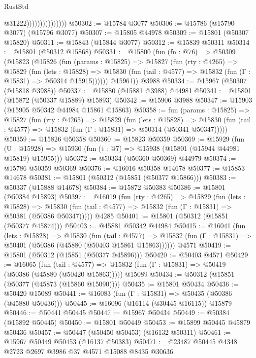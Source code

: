 \begin{lexlean}{RustStd}
\begin{coremodule}
                                  @31222)))))))))))))))
@50302 := @15784 @3077
@50306 := @15786 (@15790 @3077) (@15796 @3077)
@50307 := @15805 @44978
@50309 := @15801 (@50307 @15820)
@50311 := @15843 (@15844 @3077)
@50312 := @15839 @50311
@50314 := @15801 (@50312 @15868)
@50331 := @15800
    (fun (fn : @76) =>
    @50309
      (@15823
        (@15826
          (fun (params : @15825) =>
          @15827
            (fun (rty : @4265) =>
            @15829
              (fun (lets : @15828) =>
              @15830 (fun (tail : @4577) => @15832 (fun (Γ : @15831) => @50314 @15915))))))
        @15961))
    @3988
@50334 := @15967 (@50307 (@15818 @3988))
@50337 := @15880 (@15881 @3988) @44981
@50341 := @15801 (@15872 (@50337 @15889) @15893)
@50342 := @15906 @3988
@50347 := @15903 (@15905 @50342 @44984 @15861 @15863)
@50358 := fun (params : @15825) =>
  @15827
    (fun (rty : @4265) =>
    @15829
      (fun (lets : @15828) =>
      @15830 (fun (tail : @4577) => @15832 (fun (Γ : @15831) => @50314 (@50341 @50347)))))
@50359 := @15826 @50358
@50360 := @15823 @50359
@50369 := @15929
    (fun (U : @15928) => @15930 (fun (t : @7) => @15938 (@15801 (@15944 @44981 @15819) @15955)))
@50372 := @50334 (@50360 @50369) @44979
@50374 := @15786 @50359 @50369
@50376 := @16016 @50358 @14678
@50377 := @15853 @14678
@50381 := @15801 (@50312 (@15851 (@50377 @15866)))
@50383 := @50337 (@15888 @14678)
@50384 := @15872 @50383
@50386 := @15801 (@50384 @15893)
@50397 := @16019
    (fun (rty : @4265) =>
    @15829
      (fun (lets : @15828) =>
      @15830 (fun (tail : @4577) => @15832 (fun (Γ : @15831) => @50381 (@50386 @50347)))))
    @4285
@50401 := @15801 (@50312 (@15851 (@50377 @45874)))
@50403 := @45881 @50342 @44984
@50415 := @16041
    (fun (lets : @15828) =>
    @15830
      (fun (tail : @4577) =>
      @15832 (fun (Γ : @15831) => @50401 (@50386 (@45880 (@50403 @15861 @15863))))))
    @4571
@50419 := @15801 (@50312 (@15851 (@50377 @45896)))
@50420 := @50403 @4571
@50429 := @16065
    (fun (tail : @4577) => @15832 (fun (Γ : @15831) => @50419 (@50386 (@45880 (@50420 @15863)))))
    @15089
@50434 := @50312 (@15851 (@50377 (@45873 (@15860 @15090))))
@50435 := @15801 @50434
@50436 := @50420 @15089
@50441 := @16083 (fun (Γ : @15831) => @50435 (@50386 (@45880 @50436)))
@50445 := @16096 (@16114 (@30445 @16115)) @15879
@50446 := @50441 @50445
@50447 := @15967 @50434
@50449 := @50384 (@15892 @50445)
@50450 := @15801 @50449
@50453 := @15899 @50445 @45879 @50436
@50457 := @50447 (@50450 @50453) (@16132 @50311)
@50461 := @15967 @50449 @50453 (@16137 @50383)
@50471 := @23487 @50445 @4348 @2723 @2697 @3986 @37 @4571 @15088 @8435 @30636

\end{coremodule}
\end{lexlean}
